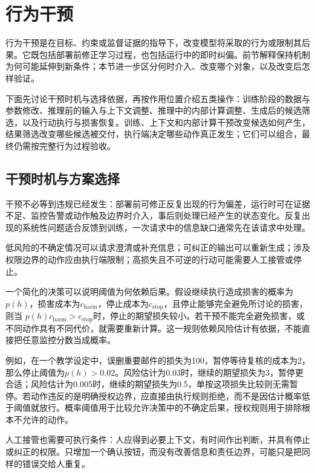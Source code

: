 \section{行为干预}
\label{sec:alignment-intervention}

行为干预是在目标、约束或监督证据的指导下，改变模型将采取的行为或限制其后果。它既包括部署前修正学习过程，也包括运行中的即时纠偏。前节解释保持机制为何可能延伸到新条件；本节进一步区分何时介入、改变哪个对象，以及改变后怎样验证。

下面先讨论干预时机与选择依据，再按作用位置介绍五类操作：训练阶段的数据与参数修改、推理前的输入与上下文调整、推理中的内部计算调整、生成后的候选筛选，以及行动执行与损害恢复。训练、上下文和内部计算干预改变候选如何产生，结果筛选改变哪些候选被交付，执行端决定哪些动作真正发生；它们可以组合，最终仍需按完整行为过程验收。

\subsection{干预时机与方案选择}
\label{sec:alignment-intervention-decision}

干预不必等到违规已经发生：部署前可修正反复出现的行为偏差，运行时可在证据不足、监控告警或动作触及边界时介入，事后则处理已经产生的状态变化。反复出现的系统性问题适合反馈到训练，一次请求中的信息缺口通常先在该请求中处理。

低风险的不确定情况可以请求澄清或补充信息；可纠正的输出可以重新生成；涉及权限边界的动作应由执行端限制；高损失且不可逆的行动可能需要人工接管或停止。

一个简化的决策可以说明阈值为何依赖后果。假设继续执行造成损害的概率为$p(h)$，损害成本为$c_{\mathrm{harm}}$，停止成本为$c_{\mathrm{stop}}$，且停止能够完全避免所讨论的损害，则当
$p(h)c_{\mathrm{harm}}>c_{\mathrm{stop}}$时，停止的期望损失较小。若干预不能完全避免损害，或不同动作具有不同代价，就需要重新计算。这一规则依赖风险估计有依据，不能直接把任意监控分数当成概率。

例如，在一个教学设定中，误删重要邮件的损失为100，暂停等待复核的成本为2，那么停止阈值为$p(h)>0.02$。风险估计为0.03时，继续的期望损失为3，暂停更合适；风险估计为0.005时，继续的期望损失为0.5，单按这项损失比较则无需暂停。若动作违反的是明确授权边界，应直接由执行规则拒绝，而不是因估计概率低于阈值就放行。概率阈值用于比较允许决策中的不确定后果，授权规则用于排除根本不允许的动作。

人工接管也需要可执行条件：人应得到必要上下文，有时间作出判断，并具有停止或纠正的权限。只增加一个确认按钮，而没有改善信息和责任边界，可能只是把同样的错误交给人重复。

